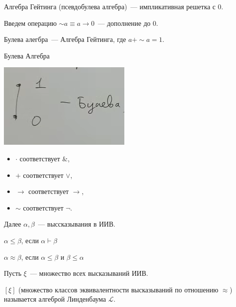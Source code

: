 \begin{definition}
    Алгебра Гейтинга (псевдобулева алгебра)~--- импликативная решетка с 0.
\end{definition}

\begin{definition}
    Введем операцию $\sim a \equiv a \to 0$~--- дополнение до 0.
\end{definition}
\begin{definition}
    Булева алегбра~--- Алгебра Гейтинга, где $a + \sim a = 1$.
\end{definition}

\begin{example}
    Булева Алгебра

    \includegraphics[scale=0.8]{img/bool_algebra}

    \begin{itemize}
        \item $\cdot$ соответствует $\&$,
        \item $+$ соответствует $\vee$,
        \item $\to$ соответствует $\to$,
        \item $\sim$ соответствует $\neg$.
    \end{itemize}
\end{example}

Далее $\alpha, \beta$~--- выссказывания в ИИВ.

\begin{definition}
    $\alpha \leqslant \beta$, если $\alpha \vdash \beta$
\end{definition}

\begin{definition}
    $\alpha \approx \beta$, если $\alpha \leqslant \beta$ и $\beta \leqslant \alpha$
\end{definition}

\begin{definition}
    Пусть $\xi$~--- множество всех высказываний ИИВ.

    $[ \xi ]$ (множество классов эквивалентности высказываний по отношению $\approx$) называется алгеброй Линденбаума $\mathcal{L}$.
\end{definition}

